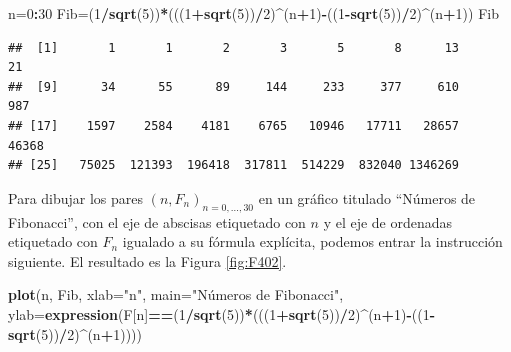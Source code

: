\documentclass[]{book}
\newenvironment{Shaded}{\begin{snugshade}}{\end{snugshade}}
\newcommand{\DataTypeTok}[1]{\textcolor[rgb]{0.13,0.29,0.53}{#1}}
\newcommand{\DecValTok}[1]{\textcolor[rgb]{0.00,0.00,0.81}{#1}}
\newcommand{\KeywordTok}[1]{\textcolor[rgb]{0.13,0.29,0.53}{\textbf{#1}}}
\newcommand{\NormalTok}[1]{#1}
\newcommand{\OperatorTok}[1]{\textcolor[rgb]{0.81,0.36,0.00}{\textbf{#1}}}
\newcommand{\StringTok}[1]{\textcolor[rgb]{0.31,0.60,0.02}{#1}}
\theoremstyle{definition}
\theoremstyle{definition}
\theoremstyle{definition}
\theoremstyle{remark}
\begin{document}
\begin{Shaded}
\begin{Highlighting}[]
\NormalTok{n=}\DecValTok{0}\OperatorTok{:}\DecValTok{30}
\NormalTok{Fib=(}\DecValTok{1}\OperatorTok{/}\KeywordTok{sqrt}\NormalTok{(}\DecValTok{5}\NormalTok{))}\OperatorTok{*}\NormalTok{(((}\DecValTok{1}\OperatorTok{+}\KeywordTok{sqrt}\NormalTok{(}\DecValTok{5}\NormalTok{))}\OperatorTok{/}\DecValTok{2}\NormalTok{)}\OperatorTok{^}\NormalTok{(n}\OperatorTok{+}\DecValTok{1}\NormalTok{)}\OperatorTok{-}\NormalTok{((}\DecValTok{1}\OperatorTok{-}\KeywordTok{sqrt}\NormalTok{(}\DecValTok{5}\NormalTok{))}\OperatorTok{/}\DecValTok{2}\NormalTok{)}\OperatorTok{^}\NormalTok{(n}\OperatorTok{+}\DecValTok{1}\NormalTok{))}
\NormalTok{Fib}
\end{Highlighting}
\end{Shaded}

\begin{verbatim}
##  [1]       1       1       2       3       5       8      13      21
##  [9]      34      55      89     144     233     377     610     987
## [17]    1597    2584    4181    6765   10946   17711   28657   46368
## [25]   75025  121393  196418  317811  514229  832040 1346269
\end{verbatim}

Para dibujar los pares \((n, F_n)_{n=0, \ldots, 30}\) en un gráfico titulado ``Números de Fibonacci'', con el eje de abscisas etiquetado con \(n\) y el eje de ordenadas etiquetado con \(F_n\) igualado a su fórmula explícita, podemos entrar la instrucción siguiente. El resultado es la Figura \ref{fig:F402}.

\begin{Shaded}
\begin{Highlighting}[]
\KeywordTok{plot}\NormalTok{(n, Fib, }\DataTypeTok{xlab=}\StringTok{"n"}\NormalTok{, }\DataTypeTok{main=}\StringTok{"Números de Fibonacci"}\NormalTok{, }
  \DataTypeTok{ylab=}\KeywordTok{expression}\NormalTok{(F[n]}\OperatorTok{==}\NormalTok{(}\DecValTok{1}\OperatorTok{/}\KeywordTok{sqrt}\NormalTok{(}\DecValTok{5}\NormalTok{))}\OperatorTok{*}\NormalTok{(((}\DecValTok{1}\OperatorTok{+}\KeywordTok{sqrt}\NormalTok{(}\DecValTok{5}\NormalTok{))}\OperatorTok{/}\DecValTok{2}\NormalTok{)}\OperatorTok{^}\NormalTok{(n}\OperatorTok{+}\DecValTok{1}\NormalTok{)}\OperatorTok{-}\NormalTok{((}\DecValTok{1}\OperatorTok{-}\KeywordTok{sqrt}\NormalTok{(}\DecValTok{5}\NormalTok{))}\OperatorTok{/}\DecValTok{2}\NormalTok{)}\OperatorTok{^}\NormalTok{(n}\OperatorTok{+}\DecValTok{1}\NormalTok{))))}
\end{Highlighting}
\end{Shaded}
\end{document}

